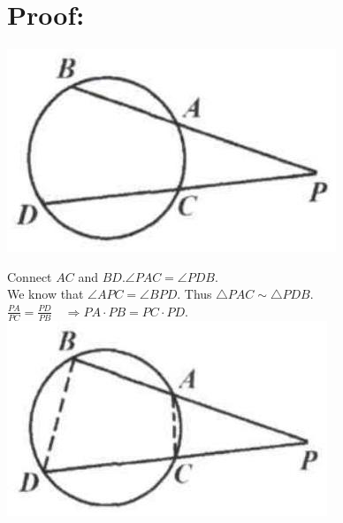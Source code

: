 \documentclass[10pt]{article}
\begin{document}
\section*{Proof:}
\begin{center}
\includegraphics[max width=\textwidth]{2025_04_17_97bc1f7e44d93c271a88g-192(3)}
\end{center}

Connect \(A C\) and \(B D . \angle P A C=\angle P D B\).\\
We know that \(\angle A P C=\angle B P D\). Thus \(\triangle P A C \sim \triangle P D B\).\\
\(\frac{P A}{P C}=\frac{P D}{P B} \quad \Rightarrow P A \cdot P B=P C \cdot P D\).\\
\includegraphics[max width=\textwidth, center]{2025_04_17_97bc1f7e44d93c271a88g-192(2)}
\end{document}
